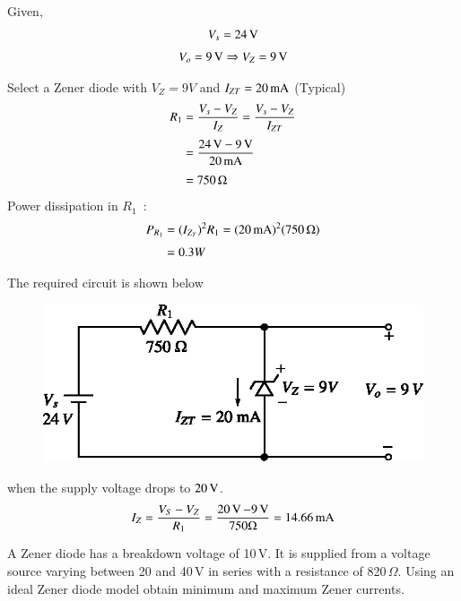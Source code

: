 \begin{solution}
Given,
\begin{gather*}
V_{s}=24\text{\,V}\\[3pt]
V_{o}=9\text{\,V}\Rightarrow V_{Z}=9\text{\,V}
\end{gather*}

Select a Zener diode with $V_{Z}=9V$ and $I_{ZT}=20\operatorname{mA}$ (Typical)
\begin{align*}
R_{1} &= \frac{V_{s}-V_{Z}}{I_{Z}}=\frac{V_{s}-V_{Z}}{I_{ZT}}\\[3pt]
&=\frac{24\text{\,V}-9\text{\,V}}{20\text{\,mA}}\\[3pt]
&= 750\,\Omega
\end{align*}
Power dissipation in $R_{1}$~:
\begin{align*}
P_{R_{1}} &= (I_{Z_{T}})^{2}R_{1}=(20\text{\,mA})^{2}(750\,\Omega)\\[3pt]
&= 0.3W
\end{align*}

\eject

The required circuit is shown below
\begin{figure}[H]
\centering
\includegraphics{chap2/sol2.27.eps}
\end{figure}
when the supply voltage drops to $20\operatorname{\mathrm{V}}$.
$$
I_{Z}=\dfrac{V_{S}-V_{Z}}{R_{1}}=\dfrac{20\operatorname{\mathrm{V}}-9\operatorname{\mathrm{V}}}{750\Omega}=14.66\text{\,mA}
$$
\vskip -1cm
\end{solution}

\begin{example}\label{exam2.28}
A Zener diode has a breakdown voltage of 10\,V. It is supplied from a voltage source varying between 20 and 40\,V in series with a resistance of 820\,$\Omega$. Using an ideal Zener diode model obtain minimum and maximum Zener currents. 
\end{example}

